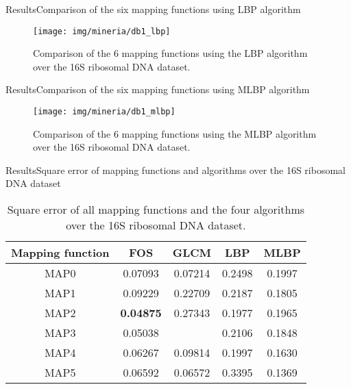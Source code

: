 \documentclass[10pt]{beamer}
\newcommand{\1}{
	\setbeamertemplate{background}{
		\texttt{[image: img/1\_dna]}
		\tikz[overlay] \fill[fill opacity=0.75,fill=white] (0,0) rectangle (-\paperwidth,\paperheight);
	}
}
\begin{document}
\begin{frame}{Results}{Comparison of the six mapping functions using LBP algorithm}
	\begin{figure}[]
		\centering
		\texttt{[image: img/mineria/db1\_lbp]}
		\caption{Comparison of the 6 mapping functions using the LBP algorithm over the 16S ribosomal DNA dataset.}
		\label{img:comp3}
	\end{figure}
\end{frame}

\begin{frame}{Results}{Comparison of the six mapping functions using MLBP algorithm}
	\begin{figure}[]
		\centering
		\texttt{[image: img/mineria/db1\_mlbp]}
		\caption{Comparison of the 6 mapping functions using the MLBP algorithm over the 16S ribosomal DNA dataset.}
		\label{img:comp3}
	\end{figure}
\end{frame}


\begin{frame}{Results}{Square error of mapping functions and algorithms over the 16S ribosomal DNA dataset}
\begin{table}[hbt!]
	\centering
	\caption{Square error of all mapping functions and the four algorithms over the 16S ribosomal DNA dataset.}
	\label{tab:comparison_score_db1}
	\setlength{\tabcolsep}{0.5em} %
	{\renewcommand{\arraystretch}{1}%
		\begin{tabular}{ccccc}
			\hline
			Mapping function    & FOS  & GLCM & LBP & MLBP \\ \hline
			MAP0 				& 0.07093 & 0.07214 & 0.2498 & 0.1997  \\
			MAP1 				& 0.09229 & 0.22709 & 0.2187 & 0.1805  \\
			MAP2 				& \textbf{0.04875} & 0.27343 & 0.1977 & 0.1965  \\
			MAP3 				& 0.05038 & 		 & 0.2106 & 0.1848  \\
			MAP4 				& 0.06267 & 0.09814 & 0.1997 & 0.1630  \\
			MAP5 				& 0.06592 & 0.06572 & 0.3395 & 0.1369  \\ \hline
		\end{tabular}
	}
\end{table}
\end{frame}
\end{document}
